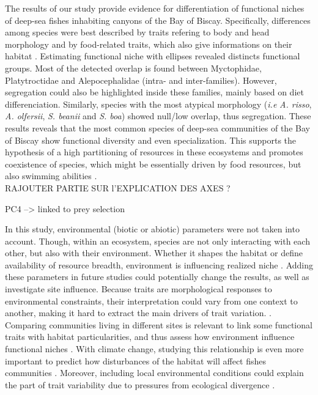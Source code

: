 
The results of our study provide evidence for differentiation of functional niches of deep-sea fishes inhabiting canyons of the Bay of Biscay. Specifically, differences among species were best described by traits refering to body and head morphology and by food-related traits, which also give informations on their habitat \citep{schoenfuss2007}. Estimating functional niche with ellipses revealed distincts functional groups. Most of the detected overlap is found between Myctophidae, Platytroctidae and Alepocephalidae (intra- and inter-families). However, segregation could also be highlighted inside these families, mainly based on diet differenciation. Similarly, species with the most atypical morphology (\emph{i.e} \textit{A. risso}, \textit{A. olfersii}, \textit{S. beanii} and \textit{S. boa}) showed null/low overlap, thus segregation. These results reveals that the most common species of deep-sea communities of the Bay of Biscay show functional diversity and even specialization. This supports the hypothesis of a high partitioning of resources in these ecosystems and promotes coexistence of species, which might be essentially driven by food resources, but also swimming abilities \citep{aneeshkumar2017,preciado2017}.\\



RAJOUTER PARTIE SUR l'EXPLICATION DES AXES ?

PC4 --> linked to prey selection

In this study, environmental (biotic or abiotic) parameters were not taken into account. Though, within an ecosystem, species are not only interacting with each other, but also with their environment. Whether it shapes the habitat or define availability of resource breadth, environment is influencing realized niche \citep{costa-pereira2019,ibanez2007,kremer2017}. Adding these parameters in future studies could potentially change the results, as well as investigate site influence. Because traits are morphological responses to environmental constraints, their interpretation could vary from one context to another, making it hard to extract the main drivers of trait variation.  \citep{kremer2017}. Comparing communities living in different sites is relevant to link some functional traits with habitat particularities, and thus assess how environment influence functional niches \citep{mejri2009}. With climate change, studying this relationship is even more important to predict how disturbances of the habitat will affect fishes communities \citep{brindamour2011}. Moreover, including local environmental conditions could explain the part of trait variability due to pressures from ecological divergence \citep{dasilva2019}.

